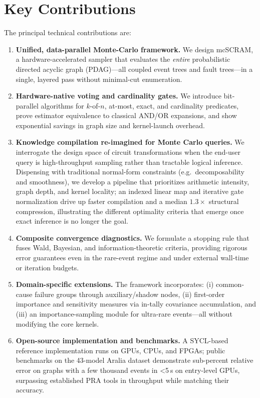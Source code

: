 \section{Key Contributions}
The principal technical contributions are:

\begin{enumerate}[label=\textbf{C\arabic*}.,leftmargin=2em]
  \item \textbf{Unified, data-parallel Monte-Carlo framework.}  We design mcSCRAM, a hardware-accelerated sampler that evaluates the \emph{entire} probabilistic directed acyclic graph (PDAG)—all coupled event trees and fault trees—in a single, layered pass without minimal-cut enumeration.

  \item \textbf{Hardware-native voting and cardinality gates.}  We introduce bit-parallel algorithms for $k$-of-$n$, at-most, exact, and cardinality predicates, prove estimator equivalence to classical AND/OR expansions, and show exponential savings in graph size and kernel-launch overhead.

  \item \textbf{Knowledge compilation re-imagined for Monte Carlo queries.}  We interrogate the design space of circuit transformations when the end-user query is high-throughput sampling rather than tractable logical inference.  Dispensing with traditional normal-form constraints (e.g.\ decomposability and smoothness), we develop a pipeline that prioritizes arithmetic intensity, graph depth, and kernel locality; an indexed linear map and iterative gate normalization drive up faster compilation and a median $1.3\times$ structural compression, illustrating the different optimality criteria that emerge once exact inference is no longer the goal.

  \item \textbf{Composite convergence diagnostics.}  We formulate a stopping rule that fuses Wald, Bayesian, and information-theoretic criteria, providing rigorous error guarantees even in the rare-event regime and under external wall-time or iteration budgets.

  \item \textbf{Domain-specific extensions.}  The framework incorporates: (i) common-cause failure groups through auxiliary/shadow nodes, (ii) first-order importance and sensitivity measures via in-tally covariance accumulation, and (iii) an importance-sampling module for ultra-rare events—all without modifying the core kernels.

  \item \textbf{Open-source implementation and benchmarks.}  A SYCL-based reference implementation runs on GPUs, CPUs, and FPGAs; public benchmarks on the 43-model Aralia dataset demonstrate sub-percent relative error on graphs with a few thousand events in <5 s on entry-level GPUs, surpassing established PRA tools in throughput while matching their accuracy.
\end{enumerate}